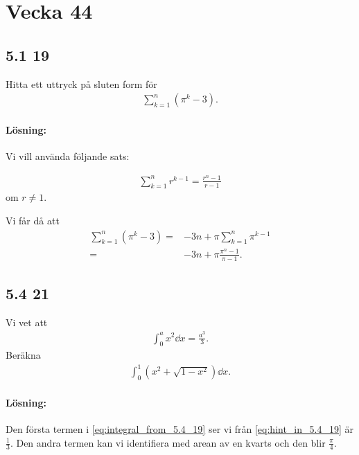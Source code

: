 \section{Vecka 44}%
\label{sec:vecka_44}

\subsection{5.1 19}%
\label{sub:5_1_19}

Hitta ett uttryck på sluten form för
\begin{align}
	\sum_{k = 1}^n (\pi^k - 3).
\end{align}

\paragraph{Lösning:}%
\label{par:losning_}

Vi vill använda följande sats:
\begin{theorem}[5.1 (d) i Adams]
	\begin{align}
		\sum_{k = 1}^n r^{k - 1} = \frac{r^n - 1}{r - 1}
	\end{align}
	om $r \neq 1$.
\end{theorem}
Vi får då att
\begin{align*}
	\sum_{k = 1}^n (\pi^k - 3) ={}& -3 n + \pi \sum_{k = 1}^n \pi^{k - 1}\\
	={}& -3 n + \pi \frac{\pi^n - 1}{\pi - 1}.
\end{align*}


\subsection{5.4 21}%
\label{sub:5_4_21}

Vi vet att
\begin{align}\label{eq:hint_in_5.4_19}
	\int_0^a x^2 \dd{x} = \frac{a^3}{3}.
\end{align}
Beräkna
\begin{align}\label{eq:integral_from_5.4_19}
	\int_0^1 (x^2 + \sqrt{1 - x^2}) \dd{x}.
\end{align}

\paragraph{Lösning:}

Den första termen i \cref{eq:integral_from_5.4_19} ser vi från \cref{eq:hint_in_5.4_19} är $\frac{1}{3}$.
Den andra termen kan vi identifiera med arean av en kvarts  och den blir $\frac{\pi}{4}$.


